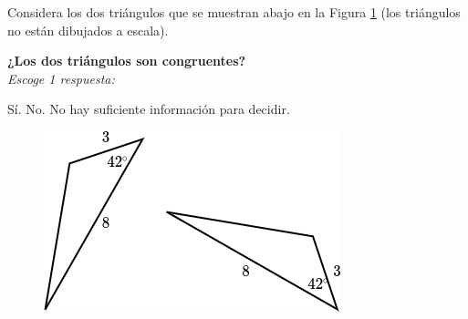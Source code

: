 Considera los dos triángulos que se muestran abajo en la Figura \ref{fig:20230323154930} (los triángulos no están dibujados a escala).

\begin{minipage}{0.6\textwidth}
    \textbf{¿Los dos triángulos son congruentes?}\\
    \emph{Escoge 1 respuesta:}\\

    \begin{choices}
        \CorrectChoice Sí.
        \choice No.
        \choice No hay suficiente información para decidir.
    \end{choices}

\end{minipage}%
\begin{minipage}{0.35\textwidth}
    \begin{figure}[H]
        \centering
        \includegraphics[width=\linewidth]{../images/20230323154930}
        \caption{}
        \label{fig:20230323154930}
    \end{figure}
\end{minipage}

